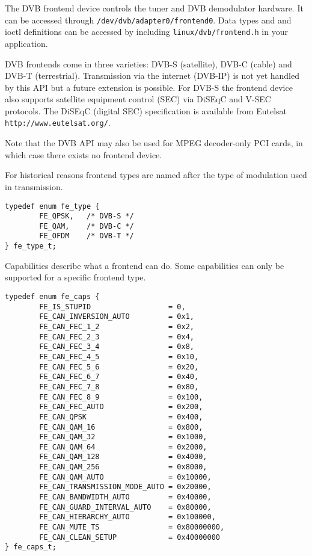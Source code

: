 
The DVB frontend device controls the tuner and DVB demodulator hardware.
It can be accessed through \texttt{/dev/dvb/adapter0/frontend0}.
Data types and and ioctl definitions can be accessed by including
\texttt{linux/dvb/frontend.h} in your application.

DVB frontends come in three varieties: DVB-S (satellite), DVB-C (cable)
and DVB-T (terrestrial). Transmission via the internet (DVB-IP) is
not yet handled by this API but a future extension is possible.
For DVB-S the frontend device also supports satellite equipment control
(SEC) via DiSEqC and V-SEC protocols. The DiSEqC (digital SEC) specification
is available from Eutelsat \texttt{http://www.eutelsat.org/}.

Note that the DVB API may also be used for MPEG decoder-only PCI cards,
in which case there exists no frontend device.


\label{frontendtype}

For historical reasons frontend types are named after the
type of modulation used in transmission.

\begin{verbatim}
typedef enum fe_type {
        FE_QPSK,   /* DVB-S */
        FE_QAM,    /* DVB-C */
        FE_OFDM    /* DVB-T */
} fe_type_t;
\end{verbatim}

\label{frontendcaps}

Capabilities describe what a frontend can do. Some capabilities
can only be supported for a specific frontend type.

\begin{verbatim}
typedef enum fe_caps {
        FE_IS_STUPID                  = 0,
        FE_CAN_INVERSION_AUTO         = 0x1,
        FE_CAN_FEC_1_2                = 0x2,
        FE_CAN_FEC_2_3                = 0x4,
        FE_CAN_FEC_3_4                = 0x8,
        FE_CAN_FEC_4_5                = 0x10,
        FE_CAN_FEC_5_6                = 0x20,
        FE_CAN_FEC_6_7                = 0x40,
        FE_CAN_FEC_7_8                = 0x80,
        FE_CAN_FEC_8_9                = 0x100,
        FE_CAN_FEC_AUTO               = 0x200,
        FE_CAN_QPSK                   = 0x400,
        FE_CAN_QAM_16                 = 0x800,
        FE_CAN_QAM_32                 = 0x1000,
        FE_CAN_QAM_64                 = 0x2000,
        FE_CAN_QAM_128                = 0x4000,
        FE_CAN_QAM_256                = 0x8000,
        FE_CAN_QAM_AUTO               = 0x10000,
        FE_CAN_TRANSMISSION_MODE_AUTO = 0x20000,
        FE_CAN_BANDWIDTH_AUTO         = 0x40000,
        FE_CAN_GUARD_INTERVAL_AUTO    = 0x80000,
        FE_CAN_HIERARCHY_AUTO         = 0x100000,
        FE_CAN_MUTE_TS                = 0x80000000,
        FE_CAN_CLEAN_SETUP            = 0x40000000
} fe_caps_t;
\end{verbatim}

